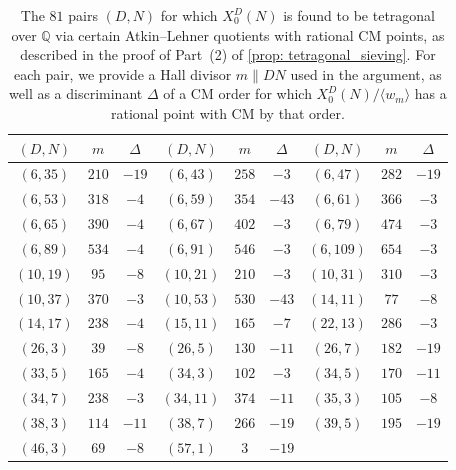 \documentclass[11pt,reqno]{amsart}
\newcommand{\Q}{\mathbb{Q}}
\theoremstyle{definition}
\begin{document}
{
\begin{longtable}{|c|c|c||c|c|c||c|c|c|}
\caption{The $81$ pairs $(D,N)$ for which $X_0^D(N)$ is found to be tetragonal over $\Q$ via certain Atkin--Lehner quotients with rational CM points, as described in the proof of Part~(2) of \cref{prop: tetragonal_sieving}. For each pair, we provide a Hall divisor $m \parallel DN$ used in the argument, as well as a discriminant $\Delta$ of a CM order for which $X_0^D(N)/\langle w_m \rangle$ has a rational point with CM by that order.}\label{table: tetragonal_by_CM} \\ \hline
$(D,N)$ & $m$ & $\Delta$ & $(D,N)$ & $m$ & $\Delta$ & $(D,N)$ & $m$ & $\Delta$ \\ \hline \hline
$ (
6 , 35 )$ & $
210 $ & $ -19 $
 & 
$ (
6 , 43 )$ & $
258 $ & $ -3 $
 & 
$ (
6 , 47 )$ & $
282 $ & $ -19 $
\\ \hline
$ (
6 , 53 )$ & $
318 $ & $ -4 $
 & 
$ (
6 , 59 )$ & $
354 $ & $ -43 $
 & 
$ (
6 , 61 )$ & $
366 $ & $ -3 $
\\ \hline
$ (
6 , 65 )$ & $
390 $ & $ -4 $
 & 
$ (
6 , 67 )$ & $
402 $ & $ -3 $
 & 
$ (
6 , 79 )$ & $
474 $ & $ -3 $
\\ \hline
$ (
6 , 89 )$ & $
534 $ & $ -4 $
 & 
$ (
6 , 91 )$ & $
546 $ & $ -3 $
 & 
$ (
6 , 109 )$ & $
654 $ & $ -3 $
\\ \hline
$ (
10 , 19 )$ & $
95 $ & $ -8 $
 & 
$ (
10 , 21 )$ & $
210 $ & $ -3 $
 & 
$ (
10 , 31 )$ & $
310 $ & $ -3 $
\\ \hline
$ (
10 , 37 )$ & $
370 $ & $ -3 $
 & 
$ (
10 , 53 )$ & $
530 $ & $ -43 $
 & 
$ (
14 , 11 )$ & $
77 $ & $ -8 $
\\ \hline
$ (
14 , 17 )$ & $
238 $ & $ -4 $
 & 
$ (
15 , 11 )$ & $
165 $ & $ -7 $
 & 
$ (
22 , 13 )$ & $
286 $ & $ -3 $
\\ \hline
$ (
26 , 3 )$ & $
39 $ & $ -8 $
 & 
$ (
26 , 5 )$ & $
130 $ & $ -11 $
 & 
$ (
26 , 7 )$ & $
182 $ & $ -19 $
\\ \hline
$ (
33 , 5 )$ & $
165 $ & $ -4 $
 & 
$ (
34 , 3 )$ & $
102 $ & $ -3 $
 & 
$ (
34 , 5 )$ & $
170 $ & $ -11 $
\\ \hline
$ (
34 , 7 )$ & $
238 $ & $ -3 $
 & 
$ (
34 , 11 )$ & $
374 $ & $ -11 $
 & 
$ (
35 , 3 )$ & $
105 $ & $ -8 $
\\ \hline
$ (
38 , 3 )$ & $
114 $ & $ -11 $
 & 
$ (
38 , 7 )$ & $
266 $ & $ -19 $
 & 
$ (
39 , 5 )$ & $
195 $ & $ -19 $
\\ \hline
$ (
46 , 3 )$ & $
69 $ & $ -8 $
 & 
$ (
57 , 1 )$ & $
3 $ & $ -19 $

\end{longtable}}
\end{document}
